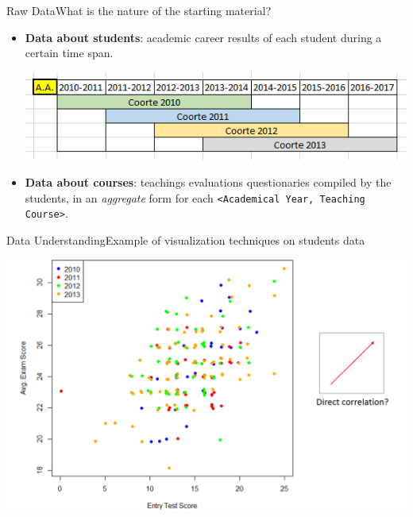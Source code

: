 \begin{frame}{Raw Data}{What is the nature of the starting material?}

\begin{itemize}

    \item<1->\textbf{Data about \alert{students}}: academic career results of each student during a certain time span. \\
        \noindent\begin{centering}
            \includegraphics[scale=0.50]{../raw/stud_comp.png}
        \end{centering}

    \item<2->\textbf{Data about \alert{courses}}: teachings evaluations questionaries compiled by the students, in an \emph{aggregate} form for each \texttt{<Academical Year, Teaching Course>}.

\end{itemize}

\end{frame}

\begin{frame}{Data Understanding}{Example of visualization techniques on students data}

    \vspace{0.2cm}
    \begin{centering}
        \includegraphics[scale=0.28]{img2_noback.png}
    \end{centering}

\end{frame}

